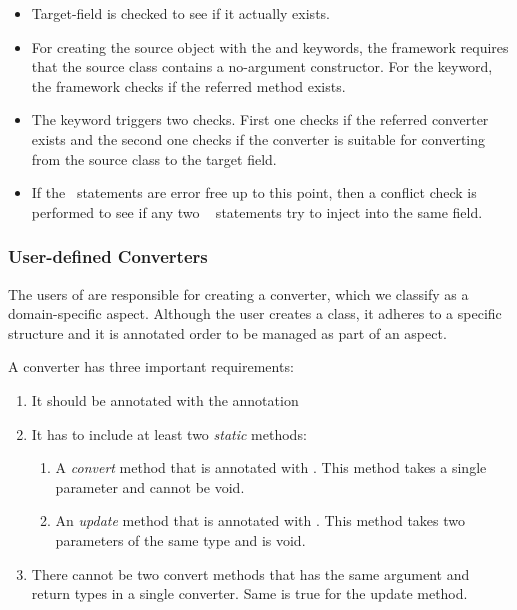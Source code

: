 \begin{itemize}
\item Target-field is checked to see if it actually exists.
\item For creating the source object with the  and  keywords, the framework requires that the source class contains a no-argument constructor. For the  keyword, the framework checks if the referred method exists.
\item The  keyword triggers two checks. First one checks if the referred converter exists and the second one checks if the converter is suitable for converting from the source class to the target field. 
\item If the \gluer~statements are error free up to this point, then a conflict check is performed to see if any two \gluer~ statements try to inject into the same field. 
\end{itemize}



\subsubsection{User-defined Converters}
\label{sec:adapter:converter}
The users of \zamk are responsible for creating a converter, which we classify as a domain-specific aspect. Although the user creates a class, it adheres to a specific structure and it is annotated order to be managed as part of an aspect. 

A converter has three important requirements:
\begin{enumerate}
\item It should be annotated with the  annotation
\item It has to include at least two \emph{static} methods:
	\begin{enumerate}
	\item A \emph{convert} method that is annotated with . This method takes a single parameter and cannot be void. 
	\item An \emph{update} method that is annotated with . This method takes two parameters of the same type and is void.
	\end{enumerate}
\item There cannot be two convert methods that has the same argument and return types in a single converter. Same is true for the update method.  
\end{enumerate}

